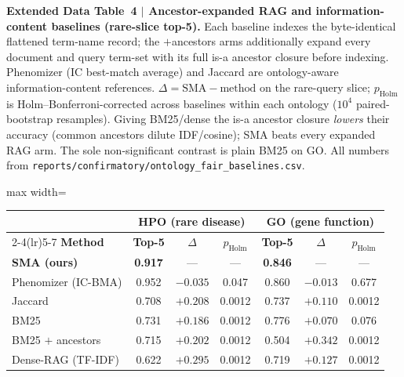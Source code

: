 \documentclass[pdflatex,sn-nature]{sn-jnl}
\newcommand{\edcaption}[1]{\par{\small #1}\par\smallskip}
\begin{document}
\begin{appendices}

\begin{table}[htbp]
\centering
\edcaption{\textbf{Extended Data Table~4 $|$ Ancestor-expanded RAG and
    information-content baselines (rare-slice top-5).}
  Each baseline indexes the byte-identical flattened term-name record; the
  $+$ancestors arms additionally expand every document and query term-set with
  its full is-a ancestor closure before indexing. Phenomizer (IC best-match
  average) and Jaccard are ontology-aware information-content references.
  $\Delta = \text{SMA} - \text{method}$ on the rare-query slice; $p_{\mathrm{Holm}}$
  is Holm--Bonferroni-corrected across baselines within each ontology
  ($10^4$ paired-bootstrap resamples). Giving BM25/dense the is-a ancestor
  closure \emph{lowers} their accuracy (common ancestors dilute IDF/cosine);
  SMA beats every expanded RAG arm. The sole non-significant contrast is plain
  BM25 on GO. All numbers from
  \texttt{reports/confirmatory/ontology\_fair\_baselines.csv}.}
\small
\setlength{\tabcolsep}{6pt}
\begin{adjustbox}{max width=\textwidth}\begin{tabular}{lcccccc}
\toprule
& \multicolumn{3}{c}{\textbf{HPO (rare disease)}} & \multicolumn{3}{c}{\textbf{GO (gene function)}} \\
\cmidrule(lr){2-4}\cmidrule(lr){5-7}
\textbf{Method} & \textbf{Top-5} & \textbf{$\Delta$} & \textbf{$p_{\mathrm{Holm}}$}
                & \textbf{Top-5} & \textbf{$\Delta$} & \textbf{$p_{\mathrm{Holm}}$} \\
\midrule
\textbf{SMA (ours)}        & \textbf{0.917} & ---      & ---     & \textbf{0.846} & ---      & ---     \\
\midrule
Phenomizer (IC-BMA)        & 0.952 & $-0.035$ & 0.047   & 0.860 & $-0.013$ & 0.677   \\
Jaccard                    & 0.708 & $+0.208$ & 0.0012  & 0.737 & $+0.110$ & 0.0012  \\
BM25                       & 0.731 & $+0.186$ & 0.0012  & 0.776 & $+0.070$ & 0.076   \\
BM25 $+$ ancestors         & 0.715 & $+0.202$ & 0.0012  & 0.504 & $+0.342$ & 0.0012  \\
Dense-RAG (TF-IDF)         & 0.622 & $+0.295$ & 0.0012  & 0.719 & $+0.127$ & 0.0012  \\

\end{tabular}
\end{adjustbox}
\end{table}
\end{appendices}
\end{document}
